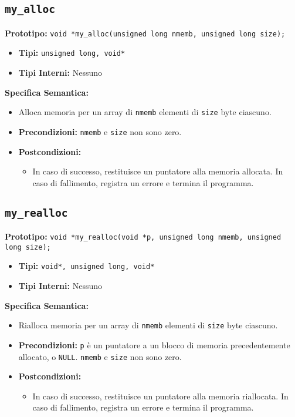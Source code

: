 \documentclass{article}
\begin{document}
\subsection{\texttt{my\_alloc}}
\textbf{Prototipo:} \texttt{void *my\_alloc(unsigned long nmemb, unsigned long size);}

\begin{itemize}[label=--,leftmargin=*]
    \item \textbf{Tipi:} \texttt{unsigned long, void*}
    \item \textbf{Tipi Interni:} Nessuno
\end{itemize}

\flushleft
\textbf{Specifica Semantica:}
\begin{itemize}[label=--,leftmargin=*]
    \item Alloca memoria per un array di \texttt{nmemb} elementi di \texttt{size} byte ciascuno.
    \item \textbf{Precondizioni:} \texttt{nmemb} e \texttt{size} non sono zero.
    \item \textbf{Postcondizioni:}
    \begin{itemize}[label=--,leftmargin=*]
        \item In caso di successo, restituisce un puntatore alla memoria allocata. In caso di fallimento, registra un errore e termina il programma.
    \end{itemize}
\end{itemize}

\subsection{\texttt{my\_realloc}}
\textbf{Prototipo:} \texttt{void *my\_realloc(void *p, unsigned long nmemb, unsigned long size);}

\begin{itemize}[label=--,leftmargin=*]
    \item \textbf{Tipi:} \texttt{void*, unsigned long, void*}
    \item \textbf{Tipi Interni:} Nessuno
\end{itemize}

\flushleft
\textbf{Specifica Semantica:}
\begin{itemize}[label=--,leftmargin=*]
    \item Rialloca memoria per un array di \texttt{nmemb} elementi di \texttt{size} byte ciascuno.
    \item \textbf{Precondizioni:} \texttt{p} è un puntatore a un blocco di memoria precedentemente allocato, o \texttt{NULL}. \texttt{nmemb} e \texttt{size} non sono zero.
    \item \textbf{Postcondizioni:}
    \begin{itemize}[label=--,leftmargin=*]
        \item In caso di successo, restituisce un puntatore alla memoria riallocata. In caso di fallimento, registra un errore e termina il programma.
    \end{itemize}
\end{itemize}
\end{document}
